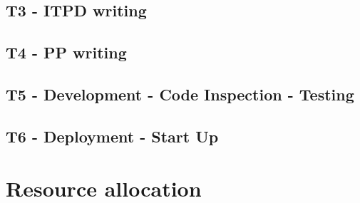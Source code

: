 \documentclass[english]{article}
\begin{document}

\subsection{T3 - ITPD writing}


\subsection{T4 - PP writing}


\subsection{T5 - Development - Code Inspection -  Testing}


\subsection{T6 - Deployment - Start Up}



\section{Resource allocation}
\end{document}
